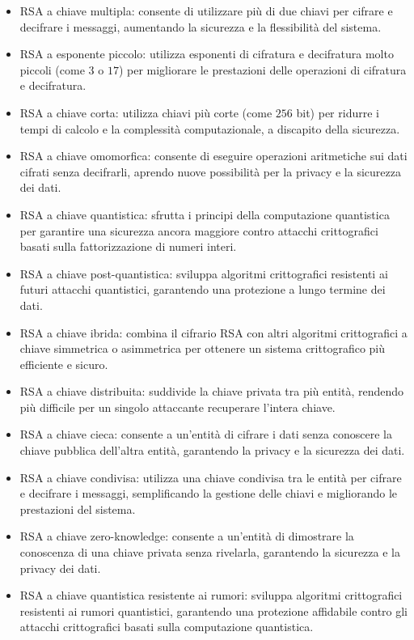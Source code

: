 \documentclass[a4paper,12pt]{report}
\begin{document}
\begin{itemize}
    \item RSA a chiave multipla: consente di utilizzare più di due chiavi per cifrare e decifrare i messaggi, aumentando la sicurezza e la flessibilità del sistema.
    \item RSA a esponente piccolo: utilizza esponenti di cifratura e decifratura molto piccoli (come $3$ o $17$) per migliorare le prestazioni delle operazioni di cifratura e decifratura.
    \item RSA a chiave corta: utilizza chiavi più corte (come $256$ bit) per ridurre i tempi di calcolo e la complessità computazionale, a discapito della sicurezza.
    \item RSA a chiave omomorfica: consente di eseguire operazioni aritmetiche sui dati cifrati senza decifrarli, aprendo nuove possibilità per la privacy e la sicurezza dei dati.
    \item RSA a chiave quantistica: sfrutta i principi della computazione quantistica per garantire una sicurezza ancora maggiore contro attacchi crittografici basati sulla fattorizzazione di numeri interi.
    \item RSA a chiave post-quantistica: sviluppa algoritmi crittografici resistenti ai futuri attacchi quantistici, garantendo una protezione a lungo termine dei dati.
    \item RSA a chiave ibrida: combina il cifrario RSA con altri algoritmi crittografici a chiave simmetrica o asimmetrica per ottenere un sistema crittografico più efficiente e sicuro.
    \item RSA a chiave distribuita: suddivide la chiave privata tra più entità, rendendo più difficile per un singolo attaccante recuperare l'intera chiave.
    \item RSA a chiave cieca: consente a un'entità di cifrare i dati senza conoscere la chiave pubblica dell'altra entità, garantendo la privacy e la sicurezza dei dati.
    \item RSA a chiave condivisa: utilizza una chiave condivisa tra le entità per cifrare e decifrare i messaggi, semplificando la gestione delle chiavi e migliorando le prestazioni del sistema.
    \item RSA a chiave zero-knowledge: consente a un'entità di dimostrare la conoscenza di una chiave privata senza rivelarla, garantendo la sicurezza e la privacy dei dati.
    \item RSA a chiave quantistica resistente ai rumori: sviluppa algoritmi crittografici resistenti ai rumori quantistici, garantendo una protezione affidabile contro gli attacchi crittografici basati sulla computazione quantistica.

\end{itemize}
\end{document}
